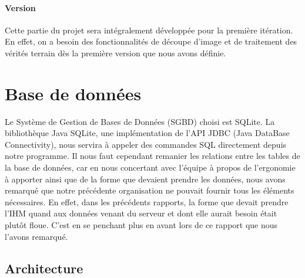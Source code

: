 \paragraph{Version}
Cette partie du projet sera intégralement développée pour la première itération. En effet, on a besoin des fonctionnalités de découpe d'image et de traitement des vérités terrain dès la première version que nous avons définie.

\section{Base de données}

Le Système de Gestion de Bases de Données (SGBD) choisi est SQLite. La bibliothèque Java SQLite, une implémentation de l'API JDBC (Java DataBase Connectivity), nous servira à appeler des commandes SQL directement depuis notre programme.
Il nous faut cependant remanier les relations entre les tables de la base de données, car en nous concertant avec l'équipe à propos de l'ergonomie à apporter ainsi que de la forme que devaient prendre les données, nous avons remarqué que notre précédente organisation ne pouvait fournir tous les éléments nécessaires. En effet, dans les précédents rapports, la forme que devait prendre l'IHM quand aux données venant du serveur et dont elle aurait besoin était plutôt floue. C'est en se penchant plus en avant lors de ce rapport que nous l'avons remarqué.

\subsection{Architecture}

